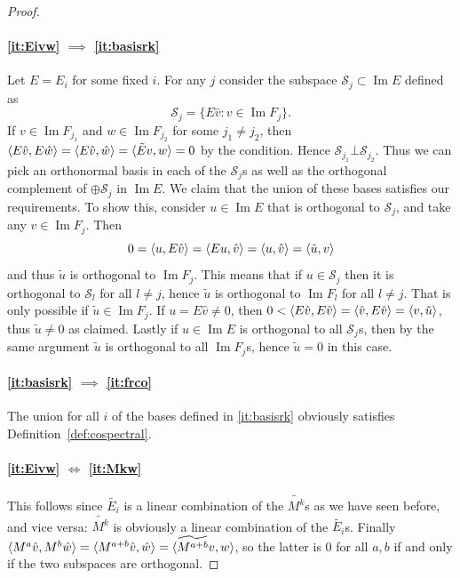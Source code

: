 \documentclass[11pt]{article}
\theoremstyle{definition}
\numberwithin{equation}{section}
\newcommand\+{\mkern2mu}
\newcommand{\1}{\mathbf 1}
\DeclareMathOperator{\im}{Im}
\DeclarePairedDelimiter{\sprod}{\langle}{\rangle}
\begin{document}
\begin{proof}
\paragraph{\ref{it:Eivw} $\implies$ \ref{it:basisrk}} Let $E = E_i$ for some fixed $i$. For any $j$ consider the subspace $\mathcal{S}_j \subset \im E$ defined as
\[ \mathcal{S}_j = \{ E \hat{v} : v \in \im F_j \}. \]
If $v \in \im F_{j_1}$ and $w \in \im F_{j_2}$ for some $j_1 \neq j_2$, then $\sprod{E \hat{v}, E\hat{w}} = \sprod{E \hat{v}, \hat{w}} = \sprod{\tilde{E} v, w} = 0$ by the condition. Hence $\mathcal{S}_{j_1} \bot \mathcal{S}_{j_2}$. Thus we can pick an orthonormal basis in each of the $\mathcal{S}_j$s as well as the orthogonal complement of $\oplus \mathcal{S}_j$ in $\im E$. We claim that the union of these bases satisfies our requirements. To show this, consider $u \in \im E$ that is orthogonal to $\mathcal{S}_j$, and take any $v \in \im F_j$. Then
\[ 0 = \sprod{u, E \hat{v}} = \sprod{E u, \hat{v}} = \sprod{u, \hat{v}} = \sprod{\tilde{u},v}\] and thus $\tilde{u}$ is orthogonal to $\im F_j$. This means that if $u \in \mathcal{S}_j$ then it is orthogonal to $\mathcal{S}_{l}$ for all $l \neq j$, hence $\tilde{u}$ is orthogonal to $\im F_l$ for all $l \neq j$. That is only possible if $\tilde{u} \in \im F_j$. If $u = E\hat{v} \neq 0$, then $0 < \sprod{E \hat{v}, E \hat{v}} = \sprod{\hat{v},E\hat{v}} = \sprod{v, \tilde{u}}$, thus $\tilde{u} \neq 0$ as claimed. Lastly if $u \in \im E$ is orthogonal to all $\mathcal{S}_j$s, then by the same argument $\tilde{u}$ is orthogonal to all $\im F_j$s, hence $\tilde{u} = 0$ in this case.

\paragraph{\ref{it:basisrk} $\implies$ \ref{it:frco}} The union for all $i$ of the bases defined in \ref{it:basisrk} obviously satisfies Definition~\ref{def:cospectral}.

\paragraph{\ref{it:Eivw} $\Longleftrightarrow$ \ref{it:Mkw}} This follows since $\tilde{E_i}$ is a linear combination of the $\widetilde{M^k}$s as we have seen before, and vice versa: $\widetilde{M^k}$ is obviously a linear combination of the $\tilde{E_i}$s. Finally $\sprod{M^a \hat{v}, M^b \hat{w}} = \sprod{M^{a+b} \hat{v}, \hat{w}} = \sprod{\widetilde{M^{a+b}}v, w}$, so the latter is 0 for all $a,b$ if and only if the two subspaces are orthogonal. 
\end{proof}
\end{document}
